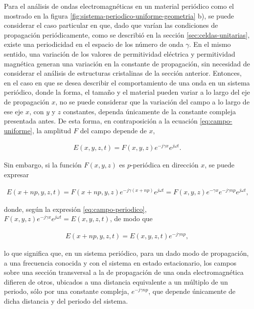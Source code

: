 Para el análisis de ondas electromagnéticas en un material periódico como el mostrado en la figura \ref{fig:sistema-periodico-uniforme-geometria} b), se puede considerar el caso particular en que, dado que varían las condiciones de propagación periódicamente, como se describió en la sección \ref{sec:celdas-unitarias}, existe una periodicidad en el espacio de los número de onda $\gamma$. En el mismo sentido, una variación de los valores de permitividad eléctrica y permitividad magnética generan una variación en la constante de propagación, sin necesidad de considerar el análisis de estructuras cristalinas de la sección anterior. Entonces, en el caso en que se desea describir el comportamiento de una onda en un sistema periódico, donde la forma, el tamaño y el material pueden variar a lo largo del eje de propagación $x$, no se puede considerar que la variación del campo a lo largo de ese eje $x$, con $y$ y $z$ constantes, dependa únicamente de la constante compleja presentada antes. De esta forma, en contraposición a la ecuación \ref{eq:campo-uniforme}, la amplitud $F$ del campo depende de $x$,

\begin{align}
	\label{eq:campo-periodico}
	E(x,y,z,t) = F(x,y,z) e^{-j\gamma x} e^{j\omega t}.
\end{align}

Sin embargo, si la función $F(x,y,z)$ es $p$-periódica en dirección $x$, se puede expresar

\begin{align}
E(x+np,y,z,t) = F(x+np,y,z) e^{-j\gamma (x+np)} e^{j\omega t} = F(x,y,z)  e^{-\gamma x}e^{-j\gamma np} e^{j\omega t},
\end{align}

donde, según la expresión \ref{eq:campo-periodico}, $F(x,y,z)  e^{-j\gamma x} e^{j\omega t} = E(x,y,z,t)$, de modo que

\begin{align}
	E(x+np,y,z,t) = E(x,y,z,t) e^{-j\gamma np},
\end{align}

lo que significa que, en un sistema periódico, para un dado modo de propagación, a una frecuencia conocida y con el sistema en estado estacionario, los campos sobre una sección transversal a la de propagación de una onda electromagnética difieren de otros, ubicados a una distancia equivalente a un múltiplo de un periodo, sólo por una constante compleja,  $e^{-j\gamma np}$, que depende únicamente de dicha distancia y del periodo del sistema.

